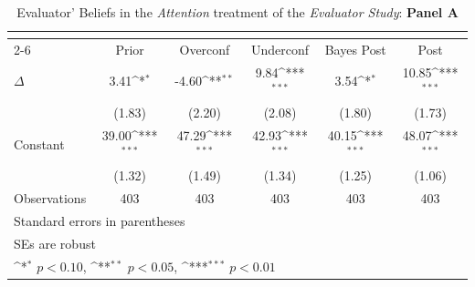 \begin{table}[htbp]\centering
\def\sym#1{\ifmmode^{#1}\else\(^{#1}\)\fi}
\caption{Evaluator’ Beliefs in the \textit{Attention} treatment of the \textit{Evaluator Study}: \textbf{Panel A}}
\begin{tabular}{l*{5}{c}}
\hline\hline
                &\multicolumn{5}{c}{}                                                                          \\\cmidrule(lr){2-6}
                &\multicolumn{1}{c}{Prior}&\multicolumn{1}{c}{Overconf}&\multicolumn{1}{c}{Underconf}&\multicolumn{1}{c}{Bayes Post}&\multicolumn{1}{c}{Post}\\
\hline
$\Delta$        &     3.41\sym{*}  &    -4.60\sym{**} &     9.84\sym{***}&     3.54\sym{*}  &    10.85\sym{***}\\
                &   (1.83)         &   (2.20)         &   (2.08)         &   (1.80)         &   (1.73)         \\
Constant        &    39.00\sym{***}&    47.29\sym{***}&    42.93\sym{***}&    40.15\sym{***}&    48.07\sym{***}\\
                &   (1.32)         &   (1.49)         &   (1.34)         &   (1.25)         &   (1.06)         \\
\hline
Observations    &      403         &      403         &      403         &      403         &      403         \\
\hline\hline
\multicolumn{6}{l}{\footnotesize Standard errors in parentheses}\\
\multicolumn{6}{l}{\footnotesize SEs are robust}\\
\multicolumn{6}{l}{\footnotesize \sym{*} \(p<0.10\), \sym{**} \(p<0.05\), \sym{***} \(p<0.01\)}\\
\end{tabular}
\end{table}
